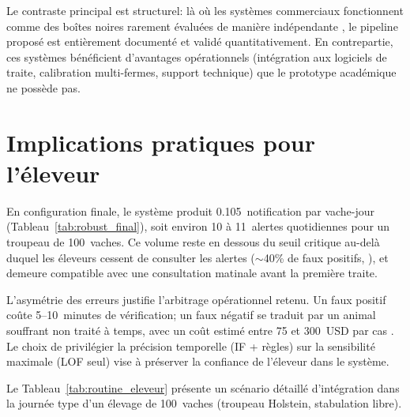 Le contraste principal est structurel: là où les systèmes commerciaux fonctionnent comme des
boîtes noires rarement évaluées de manière indépendante \citep{rutten2013invited}, le
pipeline proposé est entièrement documenté et validé quantitativement. En contrepartie, ces
systèmes bénéficient d'avantages opérationnels (intégration aux logiciels de traite,
calibration multi-fermes, support technique) que le prototype académique ne possède pas.

\FloatBarrier
\section{Implications pratiques pour l'éleveur}

En configuration finale, le système produit 0.105~notification par vache-jour
(Tableau~\ref{tab:robust_final}), soit environ 10 à 11~alertes quotidiennes
pour un troupeau de 100~vaches. Ce volume reste en dessous du seuil critique au-delà duquel
les éleveurs cessent de consulter les alertes ($\sim$40\% de faux positifs,
\citep{rutten2013invited}), et demeure compatible avec une consultation matinale avant la
première traite.

L'asymétrie des erreurs justifie l'arbitrage opérationnel retenu. Un faux positif coûte
5--10~minutes de vérification; un faux négatif se traduit par un animal souffrant non
traité à temps, avec un coût estimé entre 75 et 300~USD par cas
\citep{green2002financial,rodrigues2017lameness}. Le choix de privilégier la précision
temporelle (IF + règles) sur la sensibilité maximale (LOF seul) vise à préserver la
confiance de l'éleveur dans le système.

Le Tableau~\ref{tab:routine_eleveur} présente un scénario détaillé d'intégration dans
la journée type d'un élevage de 100~vaches (troupeau Holstein, stabulation libre).

